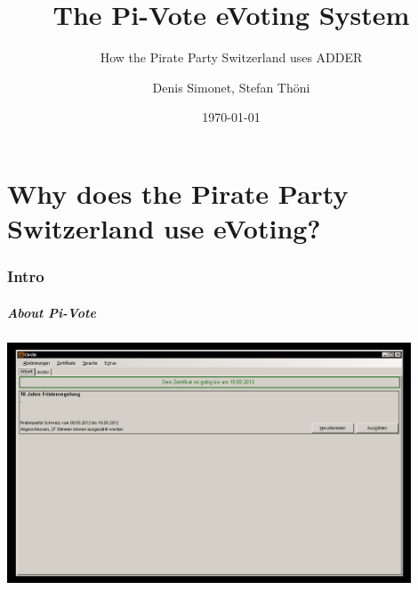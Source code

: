 \documentclass[aspectratio=1610, compress, bigger]{beamer}
\title[Pi-Vote]{The Pi-Vote eVoting System}
\subtitle{How the Pirate Party Switzerland uses ADDER}
\author[D. Simonet, S. Thöni]{Denis Simonet, Stefan Thöni}
\date[\today]{\today}
\begin{document}

%

\frame[plain]{\maketitle}



\part[Part 1]{Why does the Pirate Party Switzerland use eVoting?}

\frame[plain]{\partpage}

\section{Intro} 
\begin{frame}\frametitle{About Pi-Vote} 
\begin{center}
\includegraphics[width=12cm]{pivote.png}
\end{center}
\end{frame}
\end{document}
